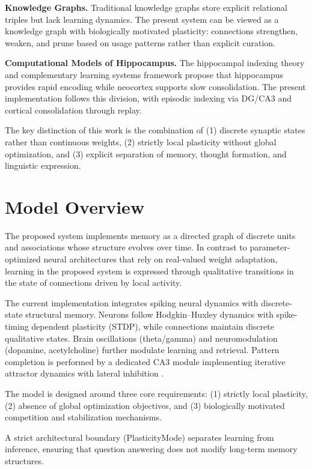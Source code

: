 \documentclass[11pt]{article}
\begin{document}
\textbf{Knowledge Graphs.} Traditional knowledge graphs store explicit relational triples but lack learning dynamics. The present system can be viewed as a knowledge graph with biologically motivated plasticity: connections strengthen, weaken, and prune based on usage patterns rather than explicit curation.

\textbf{Computational Models of Hippocampus.} The hippocampal indexing theory \citep{teyler1986hippocampal} and complementary learning systems framework \citep{mcclelland1995there} propose that hippocampus provides rapid encoding while neocortex supports slow consolidation. The present implementation follows this division, with episodic indexing via DG/CA3 and cortical consolidation through replay.

The key distinction of this work is the combination of (1) discrete synaptic states rather than continuous weights, (2) strictly local plasticity without global optimization, and (3) explicit separation of memory, thought formation, and linguistic expression.

\section{Model Overview}

The proposed system implements memory as a directed graph of discrete units and
associations whose structure evolves over time. In contrast to parameter-optimized
neural architectures that rely on real-valued weight adaptation, learning in the
proposed system is expressed through qualitative transitions in the state of
connections driven by local activity.

The current implementation integrates spiking neural dynamics with discrete-state structural memory. Neurons follow Hodgkin--Huxley dynamics with spike-timing dependent plasticity (STDP), while connections maintain discrete qualitative states. Brain oscillations (theta/gamma) and neuromodulation (dopamine, acetylcholine) further modulate learning and retrieval. Pattern completion is performed by a dedicated CA3 module implementing iterative attractor dynamics with lateral inhibition \citep{rolls2007attractor,rolls2013mechanisms}.

The model is designed around three core requirements:
(1) strictly local plasticity,
(2) absence of global optimization objectives,
and (3) biologically motivated competition and stabilization mechanisms.

A strict architectural boundary (PlasticityMode) separates learning from inference, ensuring that question answering does not modify long-term memory structures.
\end{document}
